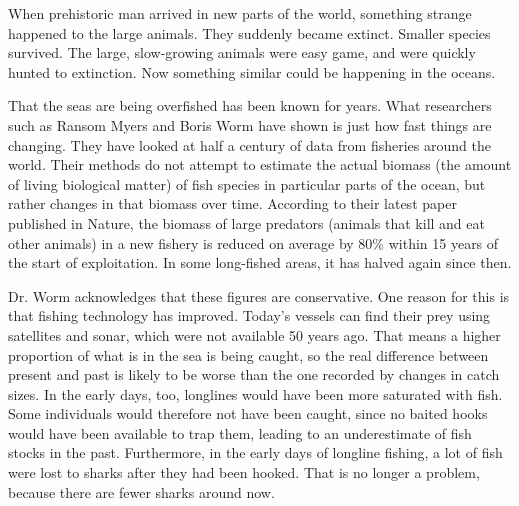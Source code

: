 \documentclass[a4paper]{article}
\begin{document}
\par
When prehistoric man arrived in new parts of the world, something strange happened to the large animals. They suddenly became extinct. Smaller species survived. The large, slow-growing animals were easy game, and were quickly hunted to extinction. Now something similar could be happening in the oceans.

\par
That the seas are being overfished has been known for years. What researchers such as Ransom Myers and Boris Worm have shown is just how fast things are changing. They have looked at half a century of data from fisheries around the world. Their methods do not attempt to estimate the actual biomass (the amount of living biological matter) of fish species in particular parts of the ocean, but rather changes in that biomass over time. According to their latest paper published in Nature, the biomass of large predators (animals that kill and eat other animals) in a new fishery is reduced on average by 80\% within 15 years of the start of exploitation. In some long-fished areas, it has halved again since then.

\par
Dr. Worm acknowledges that these figures are conservative. One reason for this is that fishing technology has improved. Today’s vessels can find their prey using satellites and sonar, which were not available 50 years ago. That means a higher proportion of what is in the sea is being caught, so the real difference between present and past is likely to be worse than the one recorded by changes in catch sizes. In the early days, too, longlines would have been more saturated with fish. Some individuals would therefore not have been caught, since no baited hooks would have been available to trap them, leading to an underestimate of fish stocks in the past. Furthermore, in the early days of longline fishing, a lot of fish were lost to sharks after they had been hooked. That is no longer a problem, because there are fewer sharks around now.
\end{document}
